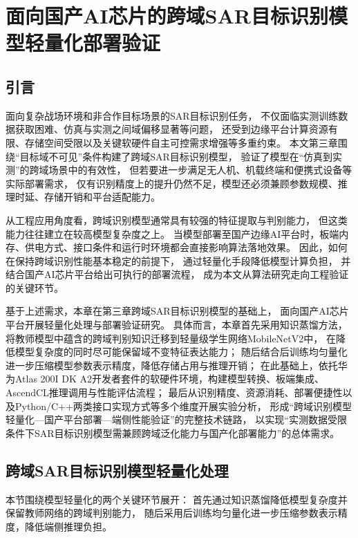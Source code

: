 \chapter{面向国产AI芯片的跨域SAR目标识别模型轻量化部署验证}


\section{引言}

面向复杂战场环境和非合作目标场景的SAR目标识别任务，
不仅面临实测训练数据获取困难、仿真与实测之间域偏移显著等问题，
还受到边缘平台计算资源有限、存储空间受限以及关键软硬件自主可控需求增强等多重约束。
本文第三章围绕“目标域不可见”条件构建了跨域SAR目标识别模型，
验证了模型在“仿真到实测”的跨域场景中的有效性，
但若要进一步满足无人机、机载终端和便携式设备等实际部署需求，
仅有识别精度上的提升仍然不足，模型还必须兼顾参数规模、推理时延、存储开销和平台适配能力。

从工程应用角度看，跨域识别模型通常具有较强的特征提取与判别能力，
但这类能力往往建立在较高模型复杂度之上。
当模型部署至国产边缘AI平台时，板端内存、供电方式、接口条件和运行时环境都会直接影响算法落地效果。
因此，如何在保持跨域识别性能基本稳定的前提下，
通过轻量化手段降低模型计算负担，
并结合国产AI芯片平台给出可执行的部署流程，
成为本文从算法研究走向工程验证的关键环节。

基于上述需求，本章在第三章跨域SAR目标识别模型的基础上，
面向国产AI芯片平台开展轻量化处理与部署验证研究。
具体而言，本章首先采用知识蒸馏方法，将教师模型中蕴含的跨域判别知识迁移到轻量级学生网络MobileNetV2中，
在降低模型复杂度的同时尽可能保留域不变特征表达能力；
随后结合后训练均匀量化进一步压缩模型参数表示精度，降低存储占用与推理开销；
在此基础上，依托华为Atlas 200I DK A2开发者套件的软硬件环境，构建模型转换、板端集成、AscendCL推理调用与性能评估流程；
最后从识别精度、资源消耗、部署便捷性以及Python/C++两类接口实现方式等多个维度开展实验分析，
形成“跨域识别模型轻量化—国产平台部署—端侧性能验证”的完整技术链路，
以实现“实测数据受限条件下SAR目标识别模型需兼顾跨域泛化能力与国产化部署能力”的总体需求。



\section{跨域SAR目标识别模型轻量化处理}

本节围绕模型轻量化的两个关键环节展开：
首先通过知识蒸馏降低模型复杂度并保留教师网络的跨域判别能力，
随后采用后训练均匀量化进一步压缩参数表示精度，降低端侧推理负担。

